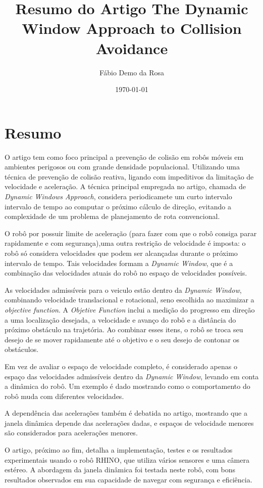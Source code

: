 \documentclass[12pt, a4paper]{article}
\begin{document}
\title{Resumo do Artigo The Dynamic Window Approach to Collision Avoidance}
\author{Fábio Demo da Rosa}
\date{\today}

\maketitle

\section{Resumo}
	O artigo tem como foco principal a prevenção de colisão em robôs móveis em ambientes perigosos ou com grande densidade populacional. Utilizando uma técnica de prevenção de colisão reativa, ligando com impeditivos da limitação de velocidade e aceleração.
	A técnica principal empregada no artigo, chamada de \textit{Dynamic Windows Approach}, considera periodicamete um curto intervalo intervalo de tempo ao computar o próximo cálculo de direção, evitando a complexidade de um problema de planejamento de rota convencional.

	O robô por possuir limite de aceleração (para fazer com que o robô consiga parar rapidamente e com segurança),uma outra restrição de velocidade é imposta: o robô só considera velocidades que podem ser alcançadas durante o próximo intervalo de tempo. 
	Tais velocidades formam a \textit{Dynamic Window}, que é a combinação das velocidades atuais do robô no espaço de velocidades possíveis.

	As velocidades admissíveis para o veiculo estão dentro da \textit{Dynamic Window}, combinando velocidade translacional e rotacional, seno escolhida ao maximizar a \textit{objective function}. A \textit{Objetive Function} inclui a medição do progresso em direção a uma localização desejada, a velocidade e avanço do robô e a distância do próximo obstáculo na trajetória.
	Ao combinar esses itens, o robô se troca seu desejo de se mover rapidamente até o objetivo e o seu desejo de contonar os obstáculos.

	Em vez de avaliar o espaço de velocidade completo, é considerado apenas o espaço das velocidades admissíveis dentro da \textit{Dynamic Window}, levando em conta a dinâmica do robô. Um exemplo é dado mostrando como o comportamento do robô muda com diferentes velocidades.

	A dependência das acelerações também é debatida no artigo, mostrando que a janela dinâmica depende das acelerações dadas, e espaços de velocidade menores são considerados para acelerações menores.

	O artigo, próximo ao fim, detalha a implementação, testes e os resultados experimentais usando o robô RHINO, que utiliza vários sensores e uma câmera estéreo. A abordagem da janela dinâmica foi testada neste robô, com bons resultados observados em sua capacidade de navegar com segurança e eficiência.
\end{document}
